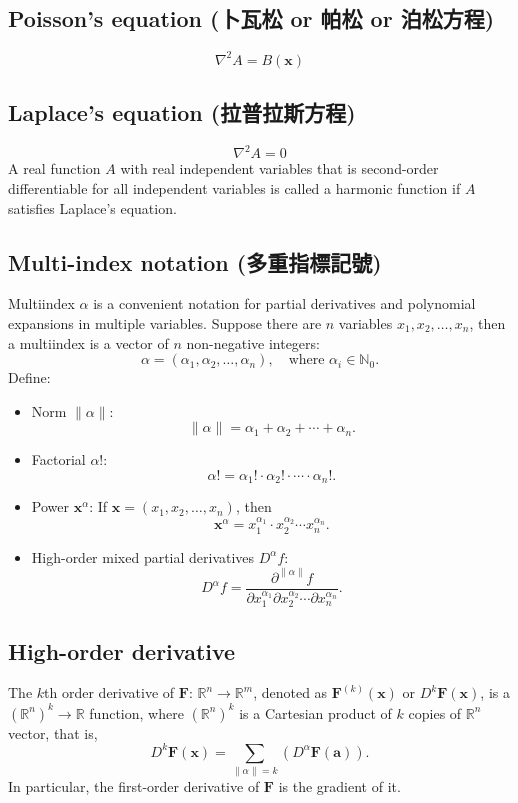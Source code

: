 \documentclass[a4paper,12pt]{report}
\begin{document}
\subsection{Poisson's equation (卜瓦松 or 帕松 or 泊松方程)}
\[
\nabla^2 A = B(\mathbf{x})
\]
\subsection{Laplace's equation (拉普拉斯方程)}
\[
\nabla^2 A = 0
\]
A real function $A$ with real independent variables that is second-order differentiable for all independent variables is called a harmonic function if $A$ satisfies Laplace's equation.
\subsection{Multi-index notation (多重指標記號)}
Multiindex \( \alpha \) is a convenient notation for partial derivatives and polynomial expansions in multiple variables. Suppose there are \( n \) variables \( x_1, x_2, \dots, x_n \), then a multiindex is a vector of \( n \) non-negative integers: 
\[
\alpha = (\alpha_1, \alpha_2, \dots, \alpha_n), \quad \text{where } \alpha_i \in \mathbb{N}_0.
\]
Define: 
\begin{itemize}
\item Norm \( \|\alpha\| \): 
\[
\|\alpha\| = \alpha_1 + \alpha_2 + \cdots + \alpha_n.
\]
\item Factorial \( \alpha! \): 
\[
\alpha! = \alpha_1! \cdot \alpha_2! \cdot \cdots \cdot \alpha_n!.
\]
\item Power \( \mathbf{x}^\alpha \): 
If \( \mathbf{x} = (x_1, x_2, \dots, x_n) \), then
\[
\mathbf{x}^\alpha = x_1^{\alpha_1} \cdot x_2^{\alpha_2} \cdots x_n^{\alpha_n}.
\]
\item High-order mixed partial derivatives $D^\alpha f$: 
\[
D^\alpha f = \frac{\partial^{\|\alpha\|} f}{\partial x_1^{\alpha_1} \partial x_2^{\alpha_2} \cdots \partial x_n^{\alpha_n}}.
\]
\end{itemize}
\subsection{High-order derivative}
The $k$th order derivative of $\mathbf{F}:\,\mathbb{R}^n\to\mathbb{R}^m$, denoted as $\mathbf{F}^{(k)}(\mathbf{x})$ or $D^{k}\mathbf{F}(\mathbf{x})$, is a $(\mathbb{R}^n)^k\to\mathbb{R}$ function, where $(\mathbb{R}^n)^k$ is a Cartesian product of $k$ copies of $\mathbb{R}^n$ vector, that is,
\[D^{k}\mathbf{F}(\mathbf{x})=\sum_{\|\alpha\|=k} \left(D^\alpha \mathbf{F}(\mathbf{a})\right).\]
In particular, the first-order derivative of $\mathbf{F}$ is the gradient of it.
\end{document}
